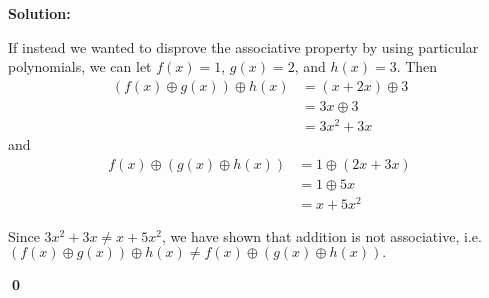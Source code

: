 \documentclass{article}
\newenvironment{solution}
{
  \ignorespaces
  \textbf{Solution:}
}
{
  \ignorespacesafterend
  \begin{flushright}
  {\bfseries \qed}
  \end{flushright}
}
\begin{document}
\begin{solution}
\begin{enumerate}[(a)]
If instead we wanted to disprove the associative property by using particular polynomials, we can 
let \(f(x)=1\), \(g(x)=2\), and \(h(x)=3\). Then
\begin{align*}
  \left( f(x) \oplus g(x) \right) \oplus h(x)
  &=\left(x+2x \right) \oplus 3\\
  &=3x \oplus 3\\
  &= 3x^2+3x
\end{align*}
and
\begin{align*}
  f(x) \oplus \left( g(x) \oplus h(x) \right)
  &=1 \oplus \left(2x+3x\right) \\
  &=1 \oplus 5x \\
  &=x + 5x^2
\end{align*}


Since \(3x^2+3x\not=x+5x^2\), we have shown
that addition is not associative, i.e.
\(
  \left( f(x) \oplus g(x) \right) \oplus h(x)
\neq
  f(x) \oplus \left( g(x) \oplus h(x) \right).
\)
\end{enumerate}
\end{solution}
\end{document}
